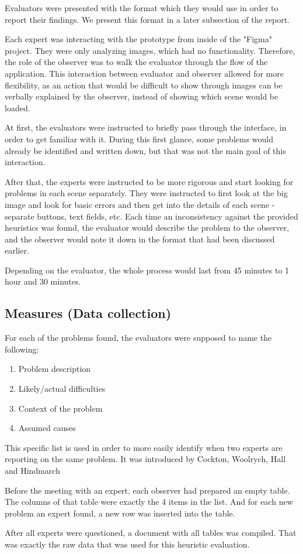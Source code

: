 Evaluators were presented with the format which they would use in order to report their findings. We present this format in a later subsection of the report.

Each expert was interacting with the prototype from inside of the "Figma" project. They were only analyzing images, which had no functionality. Therefore, the role of the observer was to walk the evaluator through the flow of the application. 
This interaction between evaluator and observer allowed for more flexibility, as an action that would be difficult to show through images can be verbally explained by the observer, instead of showing which scene would be loaded.

At first, the evaluators were instructed to briefly pass through the interface, in order to get familiar with it. During this first glance, some problems would already be identified and written down, but that was not the main goal of this interaction.

After that, the experts were instructed to be more rigorous and start looking for problems in each scene separately. They were instructed to first look at the big image and look for basic errors and then get into the details of each scene - separate buttons, text fields, etc. Each time an inconsistency against the provided heuristics was found, the evaluator would describe the problem to the observer, and the observer would note it down in the format that had been discussed earlier.

Depending on the evaluator, the whole process would last from 45 minutes to 1 hour and 30 minutes.

\subsection{Measures (Data collection)}
For each of the problems found, the evaluators were supposed to name the following:
\begin{enumerate}
  \item Problem description
  \item Likely/actual difficulties
  \item Context of the problem
  \item Assumed causes
\end{enumerate}

This specific list is used in order to more easily identify when two experts are reporting on the same problem. It was introduced by Cockton, Woolrych, Hall and Hindmarch

Before the meeting with an expert, each observer had prepared an empty table. The columns of that table were exactly the 4 items in the list. And for each new problem an expert found, a new row was inserted into the table.

After all experts were questioned, a document with all tables was compiled. That was exactly the raw data that was used for this heuristic evaluation.